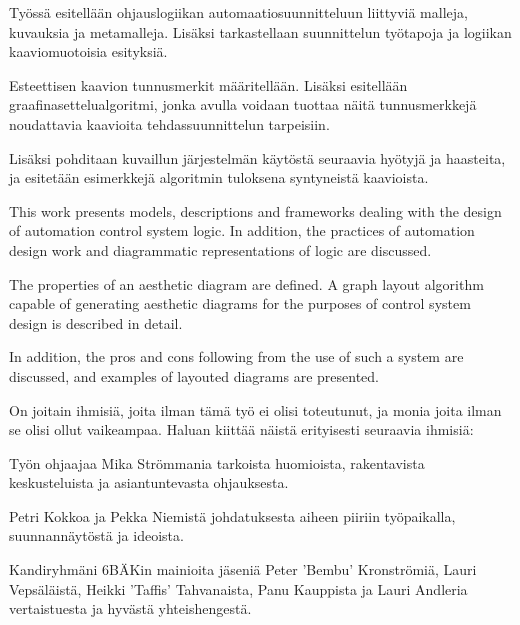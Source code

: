 \documentclass[finnish,12pt]{article}
\author{Ian Tuomi}
\date{6.12.2012}
\begin{document}
	 \makecoverpage

	\begin{abstractpage}[finnish]

Työssä esitellään ohjauslogiikan automaatiosuunnitteluun liittyviä malleja, kuvauksia ja metamalleja.
Lisäksi tarkastellaan suunnittelun työtapoja ja logiikan kaaviomuotoisia esityksiä.

Esteettisen kaavion tunnusmerkit määritellään.
Lisäksi esitellään graafinasettelualgoritmi, jonka avulla voidaan tuottaa näitä tunnusmerkkejä noudattavia kaavioita tehdassuunnittelun tarpeisiin.

Lisäksi pohditaan kuvaillun järjestelmän käytöstä seuraavia hyötyjä ja haasteita, ja esitetään esimerkkejä algoritmin tuloksena syntyneistä kaavioista.

	\end{abstractpage}
	
	
	\begin{abstractpage}[english]
	
This work presents models, descriptions and frameworks dealing with the design of automation control system logic.
In addition, the practices of automation design work and diagrammatic representations of logic are discussed.

The properties of an aesthetic diagram are defined.
A graph layout algorithm capable of generating aesthetic diagrams for the purposes of control system design is described in detail.

In addition, the pros and cons following from the use of such a system are discussed, and examples of layouted diagrams are presented.

	\end{abstractpage}
	
	\newpage


On joitain ihmisiä, joita ilman tämä työ ei olisi toteutunut, ja monia joita ilman se olisi ollut vaikeampaa.
Haluan kiittää näistä erityisesti seuraavia ihmisiä:

Työn ohjaajaa Mika Strömmania tarkoista huomioista, rakentavista keskusteluista ja asiantuntevasta ohjauksesta.

Petri Kokkoa ja Pekka Niemistä johdatuksesta aiheen piiriin työpaikalla, suunnannäytöstä ja ideoista.

Kandiryhmäni 6BÄKin mainioita jäseniä
Peter 'Bembu' Kronströmiä,
Lauri Vepsäläistä,
Heikki 'Taffis' Tahvanaista,
Panu Kauppista
ja Lauri Andleria
vertaistuesta ja hyvästä yhteishengestä.
\end{document}
